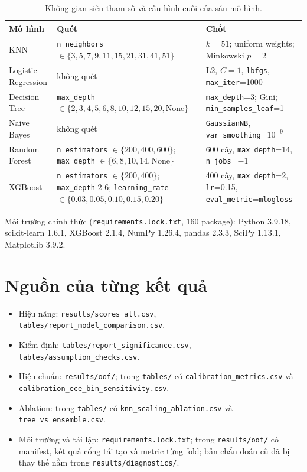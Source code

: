 \documentclass[12pt]{template/ai_conquer2026}
\begin{document}
\begin{appendices}
\begin{table}[H]\centering\small
\caption{Không gian siêu tham số và cấu hình cuối của sáu mô hình.}
\label{tab:hyperparams}
\begin{tabularx}{\linewidth}{lXX}\toprule
Mô hình & Quét & Chốt\\\midrule
KNN & \texttt{n\_neighbors} $\in\{3,5,7,9,11,15,21,31,41,51\}$
    & $k=51$; uniform weights; Minkowski $p=2$\\
Logistic Regression & không quét
    & L2, $C=1$, \texttt{lbfgs}, \texttt{max\_iter}=1000\\
Decision Tree & \texttt{max\_depth} $\in\{2,3,4,5,6,8,10,12,15,20,\mathrm{None}\}$
    & \texttt{max\_depth}=3; Gini; \texttt{min\_samples\_leaf}=1\\
Naive Bayes & không quét
    & \texttt{GaussianNB}, \texttt{var\_smoothing}=$10^{-9}$\\
Random Forest & \texttt{n\_estimators} $\in\{200,400,600\}$;
                \texttt{max\_depth} $\in\{6,8,10,14,\mathrm{None}\}$
    & 600 cây, \texttt{max\_depth}=14, \texttt{n\_jobs}=$-1$\\
XGBoost & \texttt{n\_estimators} $\in\{200,400\}$; \texttt{max\_depth} $2$-$6$;
          \texttt{learning\_rate} $\in\{0.03,0.05,0.10,0.15,0.20\}$
    & 400 cây, \texttt{max\_depth}=2, \texttt{lr}=0.15,
      \texttt{eval\_metric}=\texttt{mlogloss}\\\bottomrule
\end{tabularx}\end{table}

Môi trường chính thức (\texttt{requirements.lock.txt}, 160 package): Python
3.9.18, scikit-learn 1.6.1, XGBoost 2.1.4, NumPy 1.26.4, pandas 2.3.3, SciPy
1.13.1, Matplotlib 3.9.2.

\section{Nguồn của từng kết quả}
\begin{itemize}
\item Hiệu năng: \texttt{results/scores\_all.csv}, \texttt{tables/report\_model\_comparison.csv}.
\item Kiểm định: \texttt{tables/report\_significance.csv}, \texttt{tables/assumption\_checks.csv}.
\item Hiệu chuẩn: \texttt{results/oof/}; trong \texttt{tables/} có
\texttt{calibration\_metrics.csv} và \texttt{calibration\allowbreak\_ece\allowbreak\_bin\allowbreak\_sensitivity.csv}.
\item Ablation: trong \texttt{tables/} có \texttt{knn\allowbreak\_scaling\allowbreak\_ablation.csv} và
\texttt{tree\_vs\_ensemble.csv}.
\item Môi trường và tái lập: \texttt{requirements\allowbreak.lock\allowbreak.txt};
trong \texttt{results/oof/} có manifest, kết quả cổng tái tạo và metric từng fold;
bản chẩn đoán cũ đã bị thay thế nằm trong
\texttt{results/\allowbreak diagnostics/}.
\end{itemize}


\end{appendices}
\end{document}
